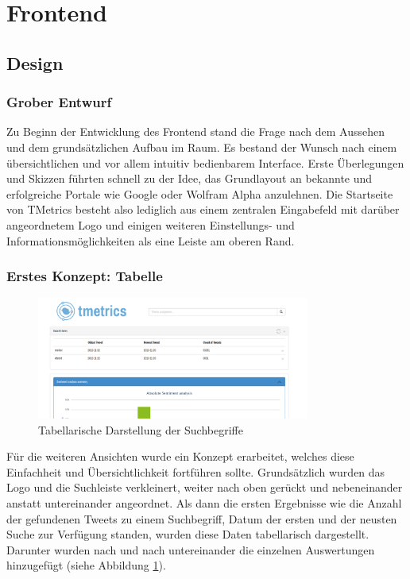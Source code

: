 \section{Frontend}
\label{sec:frontend}
\subsection{Design}

\subsubsection{Grober Entwurf}
Zu Beginn der Entwicklung des Frontend stand die Frage nach dem Aussehen und dem grundsätzlichen Aufbau im Raum. Es bestand der Wunsch nach einem übersichtlichen und vor allem intuitiv bedienbarem Interface. Erste Überlegungen und Skizzen führten schnell zu der Idee, das Grundlayout an bekannte und erfolgreiche Portale wie Google oder Wolfram Alpha anzulehnen. Die Startseite von TMetrics besteht also lediglich aus einem zentralen Eingabefeld mit darüber angeordnetem Logo und einigen weiteren Einstellungs- und Informationsmöglichkeiten als eine Leiste am oberen Rand.

\subsubsection{Erstes Konzept: Tabelle}
\label{sec:konzeptTabelle}

\begin{figure}[h!]
 \centering
 \includegraphics[width=0.8\textwidth]{./Bilder/Frontend/Screenshots/tabelleninterface.png}
\caption{Tabellarische Darstellung der Suchbegriffe}
\label{img:tabelle}
\end{figure}

Für die weiteren Ansichten wurde ein Konzept erarbeitet, welches diese Einfachheit und Übersichtlichkeit fortführen sollte. Grundsätzlich wurden das Logo und die Suchleiste verkleinert, weiter nach oben gerückt und nebeneinander anstatt untereinander angeordnet. Als dann die ersten Ergebnisse wie die Anzahl der gefundenen Tweets zu einem Suchbegriff, Datum der ersten und der neusten Suche zur Verfügung standen, wurden diese Daten tabellarisch dargestellt. Darunter wurden nach und nach untereinander die einzelnen Auswertungen hinzugefügt (siehe Abbildung \ref{img:tabelle}).

